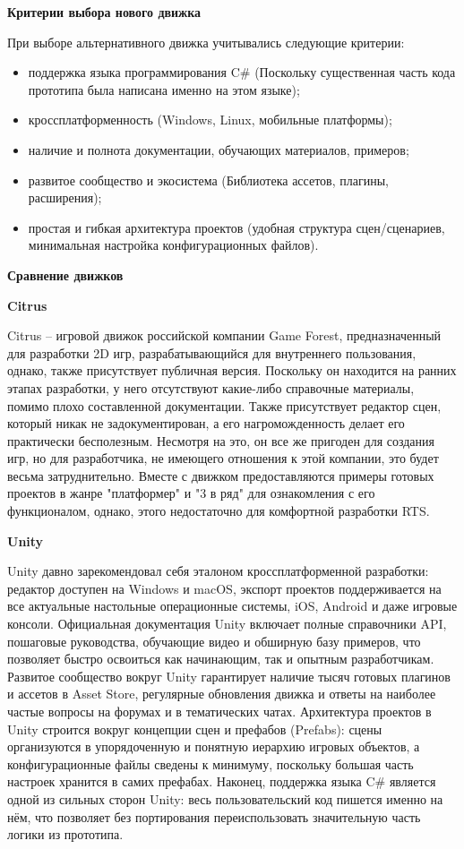         \textbf{Критерии выбора нового движка}

        При выборе альтернативного движка учитывались следующие критерии:
        \begin{itemize}
            \item поддержка языка программирования C\# (Поскольку существенная часть кода прототипа была написана именно на этом языке);
            \item кроссплатформенность (Windows, Linux, мобильные платформы);
            \item наличие и полнота документации, обучающих материалов, примеров;
            \item развитое сообщество и экосистема (Библиотека ассетов, плагины, расширения);
            \item простая и гибкая архитектура проектов (удобная структура сцен/сценариев, минимальная настройка конфигурационных файлов).
        \end{itemize}


        \textbf{Сравнение движков}

        \textbf{Citrus}

        Citrus -- игровой движок российской компании Game Forest, предназначенный для разработки 2D игр, 
        разрабатывающийся для внутреннего пользования, однако, также присутствует публичная версия. Поскольку он находится на ранних этапах разработки, 
        у него отсутствуют какие-либо справочные материалы, помимо плохо составленной документации. Также присутствует редактор сцен, который никак не 
        задокументирован, а его нагроможденность делает его практически бесполезным. Несмотря на это, он все же пригоден для создания игр, 
        но для разработчика, не имеющего отношения к этой компании, это будет весьма затруднительно. Вместе с движком предоставляются примеры готовых проектов 
        в жанре "платформер" и "3 в ряд" для ознакомления с его функционалом, однако, этого недостаточно для комфортной разработки RTS.

        \textbf{Unity}

        Unity давно зарекомендовал себя эталоном кроссплатформенной разработки: редактор доступен на Windows и macOS, экспорт проектов поддерживается на все актуальные настольные 
        операционные системы, iOS, Android и даже игровые консоли. Официальная документация Unity включает полные справочники API, пошаговые руководства, 
        обучающие видео и обширную базу примеров, что позволяет быстро освоиться как начинающим, так и опытным разработчикам. Развитое сообщество вокруг Unity гарантирует 
        наличие тысяч готовых плагинов и ассетов в Asset Store, регулярные обновления движка и ответы на наиболее частые вопросы на форумах и в тематических чатах. Архитектура проектов 
        в Unity строится вокруг концепции сцен и префабов (Prefabs): сцены организуются в упорядоченную и понятную иерархию игровых объектов, а конфигурационные файлы сведены к минимуму, 
        поскольку большая часть настроек хранится в самих префабах. Наконец, поддержка языка C\# является одной из сильных сторон Unity: весь пользовательский код пишется 
        именно на нём, что позволяет без портирования переиспользовать значительную часть логики из прототипа.
        
